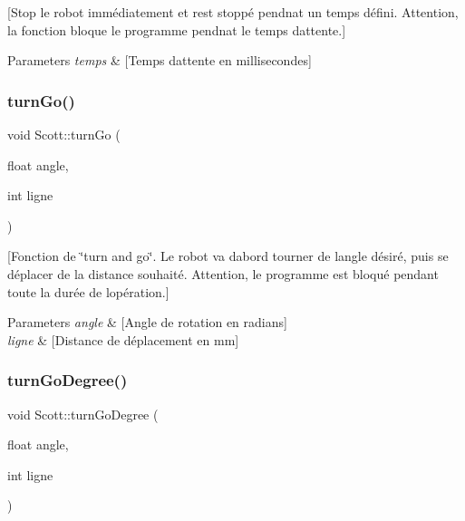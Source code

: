 \mbox{[}Stop le robot immédiatement et rest stoppé pendnat un temps défini. Attention, la fonction bloque le programme pendnat le temps d\textquotesingle{}attente.\mbox{]} 
\begin{DoxyParams}{Parameters}
{\em temps} & \mbox{[}Temps d\textquotesingle{}attente en millisecondes\mbox{]} \\
\hline
\end{DoxyParams}
\hypertarget{class_scott_ad8d8c12ec3cb4c2cc79534657edbd59e}{}\label{class_scott_ad8d8c12ec3cb4c2cc79534657edbd59e} 
\subsubsection{\texorpdfstring{turn\+Go()}{turnGo()}}
{\footnotesize\ttfamily void Scott\+::turn\+Go (\begin{DoxyParamCaption}\item[{float}]{angle,  }\item[{int}]{ligne }\end{DoxyParamCaption})}

\mbox{[}Fonction de \char`\"{}turn and go\char`\"{}. Le robot va d\textquotesingle{}abord tourner de l\textquotesingle{}angle désiré, puis se déplacer de la distance souhaité. Attention, le programme est bloqué pendant toute la durée de l\textquotesingle{}opération.\mbox{]} 
\begin{DoxyParams}{Parameters}
{\em angle} & \mbox{[}Angle de rotation en radians\mbox{]} \\
\hline
{\em ligne} & \mbox{[}Distance de déplacement en mm\mbox{]} \\
\hline
\end{DoxyParams}
\hypertarget{class_scott_a848ec37dc368c290c3bab1345310bbf1}{}\label{class_scott_a848ec37dc368c290c3bab1345310bbf1} 
\subsubsection{\texorpdfstring{turn\+Go\+Degree()}{turnGoDegree()}}
{\footnotesize\ttfamily void Scott\+::turn\+Go\+Degree (\begin{DoxyParamCaption}\item[{float}]{angle,  }\item[{int}]{ligne }\end{DoxyParamCaption})}


